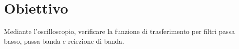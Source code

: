 \section{Obiettivo}
Mediante l'oscilloscopio, verificare la funzione di trasferimento per filtri passa basso, passa banda e reiezione di banda.